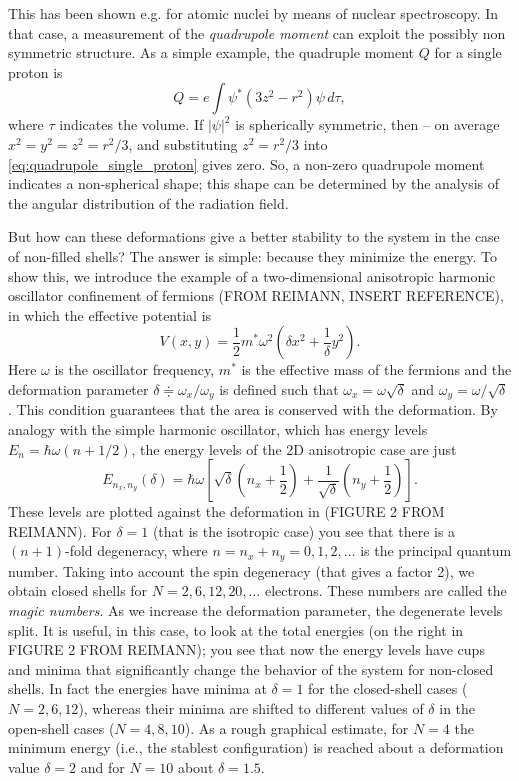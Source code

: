 \documentclass[a4paper,twoside,11pt]{book}
\begin{document}
This has been shown e.g. for atomic nuclei by means of nuclear spectroscopy. In that case, a measurement of the \emph{quadrupole moment} can exploit the possibly non symmetric structure. As a simple example, the quadruple moment $Q$ for a single proton is
\begin{equation}
	Q = e \int \psi^*(3z^2-r^2)\psi\,d\tau,
	\label{eq:quadrupole_single_proton}
\end{equation}
where $\tau$ indicates the volume. If $|\psi|^2$ is spherically symmetric, then -- on average $x^2=y^2=z^2=r^2/3$, and substituting $z^2=r^2/3$ into \eqref{eq:quadrupole_single_proton} gives zero. So, a non-zero quadrupole moment indicates a non-spherical shape; this shape can be determined by the analysis of the angular distribution of the radiation field.

But how can these deformations give a better stability to the system in the case of non-filled shells? The answer is simple: because they minimize the energy. To show this, we introduce the example of a two-dimensional anisotropic harmonic oscillator confinement of fermions (FROM REIMANN, INSERT REFERENCE), in which the effective potential is 
\begin{equation}
	V(x,y) = \frac{1}{2}m^*\omega^2\left(\delta x^2 + \frac{1}{\delta}y^2\right).
\end{equation}
Here $\omega$ is the oscillator frequency, $m^*$ is the effective mass of the fermions and the deformation parameter $\delta \doteqdot \omega_x/\omega_y$ is defined such that $\omega_x=\omega\sqrt{\delta}$ and $\omega_y=\omega/\sqrt{\delta}$. This condition guarantees that the area is conserved with the deformation. By analogy with the simple harmonic oscillator, which has energy levels $E_n = \hbar\omega(n+1/2)$, the energy levels of the 2D anisotropic case are just
\begin{equation}
	E_{n_x,n_y}(\delta) = \hbar\omega\left[\sqrt{\delta}\left(n_x+\frac{1}{2}\right) + \frac{1}{\sqrt{\delta}}\left(n_y+\frac{1}{2}\right)\right].
\end{equation}
These levels are plotted against the deformation in (FIGURE 2 FROM REIMANN). For $\delta=1$ (that is the isotropic case) you see that there is a $(n+1)$-fold degeneracy, where $n=n_x+n_y=0,1,2,\ldots$ is the principal quantum number. Taking into account the spin degeneracy (that gives a factor 2), we obtain closed shells for $N=2,6,12,20,\ldots$ electrons. These numbers are called the \emph{magic numbers}. As we increase the deformation parameter, the degenerate levels split. It is useful, in this case, to look at the total energies (on the right in FIGURE 2 FROM REIMANN); you see that now the energy levels have cups and minima that significantly change the behavior of the system for non-closed shells. In fact the energies have minima at $\delta=1$ for the closed-shell cases ($N=2,6,12$), whereas their minima are shifted to different values of $\delta$ in the open-shell cases ($N=4,8,10$). As a rough graphical estimate, for $N=4$ the minimum energy (i.e., the stablest configuration) is reached about a deformation value $\delta=2$ and for $N=10$ about $\delta=1.5$.
\end{document}
